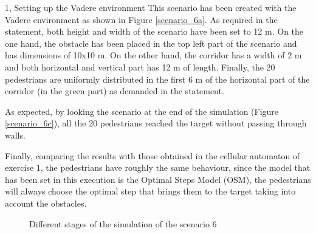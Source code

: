\documentclass[10pt,a4paper]{article}
\begin{document}
\begin{task}{1, Setting up the Vadere environment}
This scenario has been created with the Vadere environment as shown in Figure \ref{scenario_6a}. As required in the statement, both height and width of the scenario have been set to 12 m. On the one hand, the obstacle has been placed in the top left part of the scenario and has dimensions of 10x10 m. On the other hand, the corridor has a width of 2 m and both horizontal and vertical part has 12 m of length. Finally, the 20 pedestrians are uniformly distributed in the first 6 m of the horizontal part of the corridor (in the green part) as demanded in the statement.   

As expected, by looking the scenario at the end of the simulation (Figure \ref{scenario_6c}), all the 20 pedestrians reached the target without passing through walls.

Finally, comparing the results with those obtained in the cellular automaton of exercise 1, the pedestrians have roughly the same behaviour, since the model that has been set in this execution is the Optimal Steps Model (OSM), the pedestrians will always choose the optimal step that brings them to the target taking into account the obstacles.  

\begin{figure} [H]
 \centering
 \caption{Different stages of the simulation of the scenario 6}
 \label{scenario6_sim}
\end{figure}


\end{task}
\end{document}
